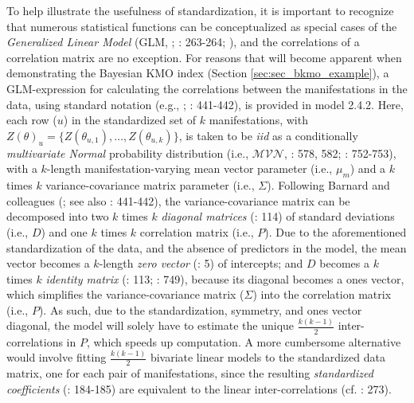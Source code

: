 \documentclass[
  10pt,
  a4paper,
  twoside]{article}
\begin{document}
To help illustrate the usefulness of standardization, it is important to recognize that numerous statistical functions can be conceptualized as special cases of the \emph{Generalized Linear Model} (GLM, ; : 263-264; ), and the correlations of a correlation matrix are no exception. For reasons that will become apparent when demonstrating the Bayesian KMO index (Section \ref{sec:sec_bkmo_example}), a GLM-expression for calculating the correlations between the manifestations in the data, using standard notation (e.g., ; : 441-442), is provided in model 2.4.2. Here, each row (\(u\)) in the standardized set of \(k\) manifestations, with \(Z(\theta)_u = \{Z(\theta_{u, 1}), \dots, Z(\theta_{u, k})\}\), is taken to be \emph{iid} as a conditionally \emph{multivariate Normal} probability distribution (i.e., \(\mathcal{MVN}\), : 578, 582; : 752-753), with a \(k\)-length manifestation-varying mean vector parameter (i.e., \(\mu_m\)) and a \(k\) times \(k\) variance-covariance matrix parameter (i.e., \(\Sigma\)). Following Barnard and colleagues (; see also : 441-442), the variance-covariance matrix can be decomposed into two \(k\) times \(k\) \emph{diagonal matrices} (: 114) of standard deviations (i.e., \(D\)) and one \(k\) times \(k\) correlation matrix (i.e., \(P\)). Due to the aforementioned standardization of the data, and the absence of predictors in the model, the mean vector becomes a \(k\)-length \emph{zero vector} (: 5) of intercepts; and \(D\) becomes a \(k\) times \(k\) \emph{identity matrix} (: 113; : 749), because its diagonal becomes a ones vector, which simplifies the variance-covariance matrix (\(\Sigma\)) into the correlation matrix (i.e., \(P\)). As such, due to the standardization, symmetry, and ones vector diagonal, the model will solely have to estimate the unique \(\frac{k(k-1)}{2}\) inter-correlations in \(P\), which speeds up computation. A more cumbersome alternative would involve fitting \(\frac{k(k-1)}{2}\) bivariate linear models to the standardized data matrix, one for each pair of manifestations, since the resulting \emph{standardized coefficients} (: 184-185) are equivalent to the linear inter-correlations (cf. : 273).
\end{document}
